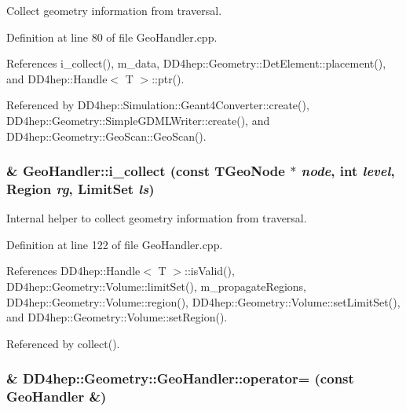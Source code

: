 Collect geometry information from traversal. 

Definition at line 80 of file GeoHandler.cpp.

References i\_\-collect(), m\_\-data, DD4hep::Geometry::DetElement::placement(), and DD4hep::Handle$<$ T $>$::ptr().

Referenced by DD4hep::Simulation::Geant4Converter::create(), DD4hep::Geometry::SimpleGDMLWriter::create(), and DD4hep::Geometry::GeoScan::GeoScan().\hypertarget{class_d_d4hep_1_1_geometry_1_1_geo_handler_ab075dd24d4b494b1f6b8508e39d6426b}{
\subsubsection[{i\_\-collect}]{ \& GeoHandler::i\_\-collect (const TGeoNode $\ast$ {\em node}, \/  int {\em level}, \/  {\bf Region} {\em rg}, \/  {\bf LimitSet} {\em ls})}}
\label{class_d_d4hep_1_1_geometry_1_1_geo_handler_ab075dd24d4b494b1f6b8508e39d6426b}


Internal helper to collect geometry information from traversal. 

Definition at line 122 of file GeoHandler.cpp.

References DD4hep::Handle$<$ T $>$::isValid(), DD4hep::Geometry::Volume::limitSet(), m\_\-propagateRegions, DD4hep::Geometry::Volume::region(), DD4hep::Geometry::Volume::setLimitSet(), and DD4hep::Geometry::Volume::setRegion().

Referenced by collect().\hypertarget{class_d_d4hep_1_1_geometry_1_1_geo_handler_a477f807851e2177e48daa15e6d88d30e}{
\subsubsection[{operator=}]{\& DD4hep::Geometry::GeoHandler::operator= (const {\bf GeoHandler} \&)}}
\label{class_d_d4hep_1_1_geometry_1_1_geo_handler_a477f807851e2177e48daa15e6d88d30e}


